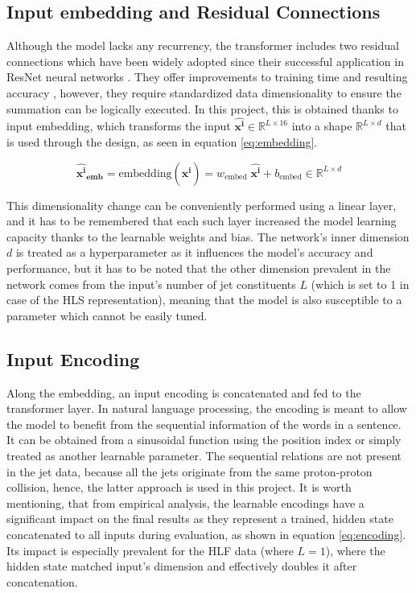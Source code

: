 \subsection{Input embedding and Residual Connections}
Although the model lacks any recurrency, the transformer includes two residual connections which have been widely adopted since their successful application in ResNet neural networks \cite{75-kaiming2016deep}. They offer improvements to training time and resulting accuracy \cite{74-szegedy2016inception-v4}, however, they require standardized data dimensionality to ensure the summation can be logically executed. In this project, this is obtained thanks to input embedding, which transforms the input \(\bm{\hat{x^i}} \in \mathbb{R}^{L \times 16} \) into a shape \(\mathbb{R}^{L \times d}\) that is used through the design, as seen in equation \ref{eq:embedding}.

\begin{equation}\label{eq:embedding}
  \bm{\hat{x^i}_{\text{emb}}} = \text{embedding} ( \bm{\hat{x^i}} ) = w_{\text{embed}}\; \bm{\hat{x^i}} + b_{\text{embed}} \in \mathbb{R}^{L \times d}
\end{equation}

This dimensionality change can be conveniently performed using a linear layer, and it has to be remembered that each such layer increased the model learning capacity thanks to the learnable weights and bias. The network's inner dimension \(d\) is treated as a hyperparameter as it influences the model's accuracy and performance, but it has to be noted that the other dimension prevalent in the network comes from the input's number of jet constituents \(L\) (which is set to 1 in case of the HLS representation), meaning that the model is also susceptible to a parameter which cannot be easily tuned.


\subsection{Input Encoding}
Along the embedding, an input encoding is concatenated and fed to the transformer layer. In natural language processing, the encoding is meant to allow the model to benefit from the sequential information of the words in a sentence. It can be obtained from a sinusoidal function using the position index or simply treated as another learnable parameter. The sequential relations are not present in the jet data, because all the jets originate from the same proton-proton collision, hence, the latter approach is used in this project. It is worth mentioning, that from empirical analysis, the learnable encodings have a significant impact on the final results as they represent a trained, hidden state concatenated to all inputs during evaluation, as shown in equation \ref{eq:encoding}. Its impact is especially prevalent for the HLF data (where \(L = 1\)), where the hidden state matched input's dimension and effectively doubles it after concatenation.

